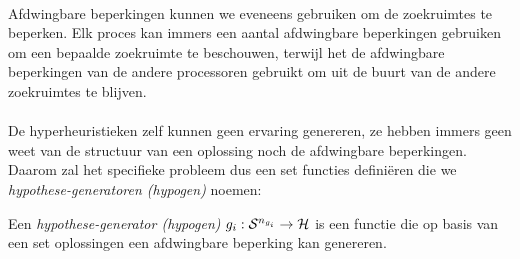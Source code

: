 \paragraph{}
Afdwingbare beperkingen kunnen we eveneens gebruiken om de zoekruimtes te beperken. Elk proces kan immers een aantal afdwingbare beperkingen gebruiken om een bepaalde zoekruimte te beschouwen, terwijl het de afdwingbare beperkingen van de andere processoren gebruikt om uit de buurt van de andere zoekruimtes te blijven.

\paragraph{}
De hyperheuristieken zelf kunnen geen ervaring genereren, ze hebben immers geen weet van de structuur van een oplossing noch de afdwingbare beperkingen. Daarom zal het specifieke probleem dus een set functies defini\"eren die we \emph{hypothese-generatoren (hypogen)} noemen:
\begin{definition}
Een \emph{hypothese-generator (hypogen)} $g_i:\mathcal{S}^{n_{g_i}}\rightarrow\mathcal{H}$ is een functie die op basis van een set oplossingen een afdwingbare beperking kan genereren.	
\end{definition}